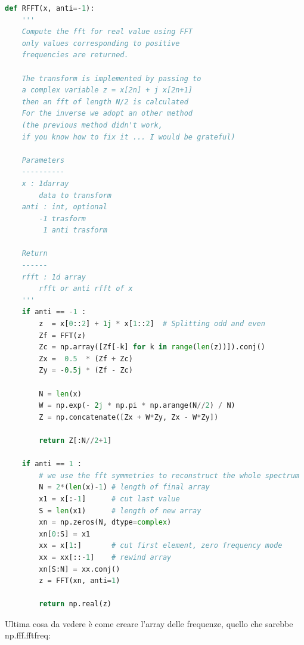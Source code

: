\documentclass[10pt,a4paper]{article}
\begin{document}
\begin{lstlisting}[language=Python]
def RFFT(x, anti=-1):
    '''
    Compute the fft for real value using FFT
    only values corresponding to positive
    frequencies are returned.

    The transform is implemented by passing to
    a complex variable z = x[2n] + j x[2n+1]
    then an fft of length N/2 is calculated
    For the inverse we adopt an other method
    (the previous method didn't work,
    if you know how to fix it ... I would be grateful)

    Parameters
    ----------
    x : 1darray
        data to transform
    anti : int, optional
        -1 trasform
         1 anti trasform

    Return
    ------
    rfft : 1d array
        rfft or anti rfft of x
    '''
    if anti == -1 :
        z  = x[0::2] + 1j * x[1::2]  # Splitting odd and even
        Zf = FFT(z)
        Zc = np.array([Zf[-k] for k in range(len(z))]).conj()
        Zx =  0.5  * (Zf + Zc)
        Zy = -0.5j * (Zf - Zc)

        N = len(x)
        W = np.exp(- 2j * np.pi * np.arange(N//2) / N)
        Z = np.concatenate([Zx + W*Zy, Zx - W*Zy])

        return Z[:N//2+1]

    if anti == 1 :
        # we use the fft symmetries to reconstruct the whole spectrum
        N = 2*(len(x)-1) # length of final array
        x1 = x[:-1]      # cut last value
        S = len(x1)      # length of new array
        xn = np.zeros(N, dtype=complex)
        xn[0:S] = x1
        xx = x[1:]       # cut first element, zero frequency mode
        xx = xx[::-1]    # rewind array
        xn[S:N] = xx.conj()
        z = FFT(xn, anti=1)

        return np.real(z)
\end{lstlisting}
Ultima cosa da vedere è come creare l'array delle frequenze, quello che sarebbe np.fff.fftfreq:
\end{document}
